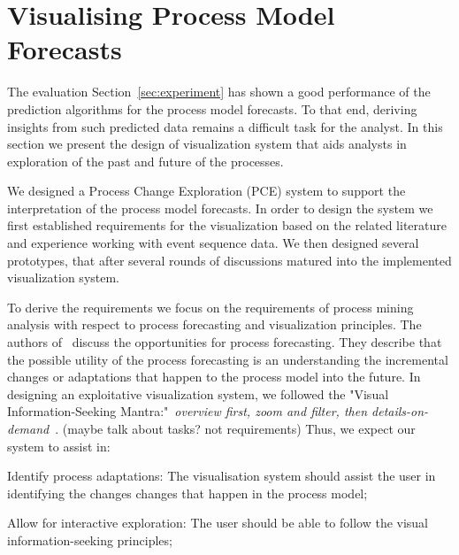 \section{Visualising Process Model Forecasts}\label{sec:visualisation}



The evaluation Section~\ref{sec:experiment} has shown a good performance of the prediction algorithms for the process model forecasts. To that end, deriving insights from such predicted data remains a difficult task for the analyst. In this section we present the design of visualization system that aids analysts in exploration of the past and future of the processes.

We designed a Process Change Exploration (PCE) system to support the interpretation of the process model forecasts. In order to design the system we first established requirements for the visualization based on the related literature and experience working with event sequence data. We then designed several prototypes, that after several rounds of discussions matured into the implemented visualization system.

To derive the requirements we focus on the requirements of process mining analysis with respect to process forecasting and visualization principles. The authors of~\cite{DBLP:conf/bpm/PollPRRR18} discuss the opportunities for process forecasting. They describe that the possible utility of the process forecasting is an understanding the incremental changes or adaptations that happen to the process model into the future. In designing an exploitative visualization system, we followed the "Visual Information-Seeking Mantra:"~\emph{overview first, zoom and filter, then details-on-demand}~\cite{DBLP:conf/vl/Shneiderman96}. 
(maybe talk about tasks? not requirements)
Thus, we expect our system to assist in:

\begin{requidescr}
	\item[Identify process adaptations:\namedlabel{req:adaptation}] The visualisation system should assist the user in identifying the changes changes that happen in the process model;
	\item[Allow for interactive exploration:\namedlabel{req:interactive}] The user should be able to follow the visual information-seeking principles;
	
\end{requidescr} %





